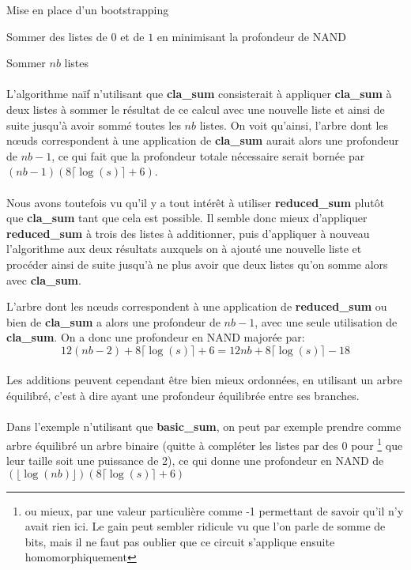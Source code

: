 \begin{section}{Mise en place d'un bootstrapping}
\begin{subsection}{Sommer des listes de $0$ et de $1$ en minimisant la profondeur de NAND}
\begin{subsubsection}{Sommer $nb$ listes}
\paragraph{}
L'algorithme naïf n'utilisant que \textbf{cla\_sum} consisterait à appliquer
\textbf{cla\_sum} à deux listes à sommer le résultat de ce calcul avec une nouvelle liste 
et ainsi de suite jusqu'à avoir sommé toutes les $nb$ listes.
On voit qu'ainsi, l'arbre dont les nœuds correspondent à une application de \textbf{cla\_sum}
aurait alors une profondeur de $nb - 1$, ce qui fait que la profondeur totale nécessaire serait 
bornée par $(nb-1)(8\lceil\log(s)\rceil + 6)$.

\paragraph{}
Nous avons toutefois vu qu'il y a tout intérêt à utiliser \textbf{reduced\_sum}
plutôt que \textbf{cla\_sum} tant que cela est possible.
Il semble donc mieux d'appliquer \textbf{reduced\_sum} à trois des listes à additionner,
puis d'appliquer à nouveau l'algorithme aux deux résultats auxquels on à ajouté une nouvelle liste et 
procéder ainsi de suite jusqu'à ne plus avoir que deux listes qu'on somme alors avec \textbf{cla\_sum}.

L'arbre dont les nœuds correspondent à une application de \textbf{reduced\_sum}
ou bien de \textbf{cla\_sum} a alors une profondeur de $nb - 1$, avec une seule utilisation de  
\textbf{cla\_sum}. On a donc une profondeur en NAND majorée par:
\[ 12(nb - 2) + 8 \lceil \log(s) \rceil + 6 = 12 nb + 8 \lceil \log(s) \rceil - 18\]
	
\paragraph{}
Les additions peuvent cependant être bien mieux ordonnées, en utilisant 
un arbre équilibré, c'est à dire ayant une profondeur équilibrée entre ses branches.

\paragraph{}
Dans l'exemple n'utilisant que \textbf{basic\_sum}, on peut par exemple prendre 
comme arbre équilibré un arbre binaire (quitte à compléter les listes par des $0$ pour
\footnote{ou mieux, par une valeur particulière comme -1 permettant de savoir qu'il n'y avait rien ici. Le gain peut 
sembler ridicule vu que l'on parle de somme de bits, mais il ne faut pas oublier que ce circuit s'applique 
ensuite homomorphiquement} que leur taille
soit une puissance de 2), ce qui donne une profondeur en NAND de   
$(\lfloor \log(nb) \rfloor)(8\lceil\log(s)\rceil + 6)$


\end{subsubsection}
\end{subsection}
\end{section}
